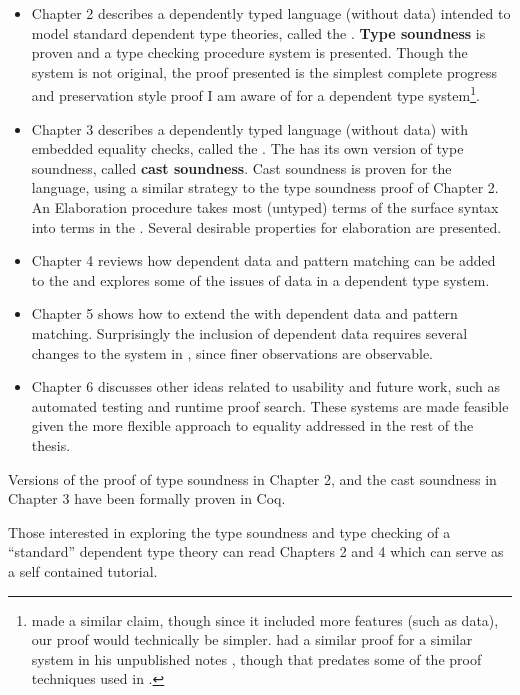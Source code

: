 \begin{itemize}
\item Chapter 2 describes a dependently typed language (without data) intended to model standard dependent type theories, called the \textbf{\slang{}}.
\textbf{Type soundness} is proven and a \bidir{} type checking procedure system is presented.
Though the system is not original, the proof presented is the simplest complete progress and preservation style proof I am aware of for a dependent type system\footnote{
  \cite{sjoberg2015dependently} made a similar claim, though since it included more features (such as data), our proof would technically be simpler.
  \MartinL{} had a similar proof for a similar system in his unpublished notes \cite{Martin-Lof-1971}, though that predates some of the proof techniques used in .
}.
\item Chapter 3 describes a dependently typed language (without data) with embedded equality checks, called the \textbf{\clang{}}.
The \clang{} has its own version of type soundness, called \textbf{cast soundness}.
Cast soundness is proven for the language, using a similar strategy to the type soundness proof of Chapter 2.
An Elaboration procedure takes most (untyped) terms of the surface syntax into terms in the \clang{}.
Several desirable properties for elaboration are presented. %
\item Chapter 4 reviews how dependent data and pattern matching can be added to the \slang{} and explores some of the issues of data in a dependent type system.
\item Chapter 5 shows how to extend the \clang{} with dependent data and pattern matching.
Surprisingly the inclusion of dependent data requires several changes to the system in , since finer observations are observable.
\item Chapter 6 discusses other ideas related to usability and future work, such as automated testing and runtime proof search.
These systems are made feasible given the more flexible approach to equality addressed in the rest of the thesis.
\end{itemize}
Versions of the proof of type soundness in Chapter 2, and the cast soundness in Chapter 3 have been formally proven in Coq.

Those interested in exploring the type soundness and type checking of a ``standard'' dependent type theory can read Chapters 2 and 4 which can serve as a self contained tutorial.
